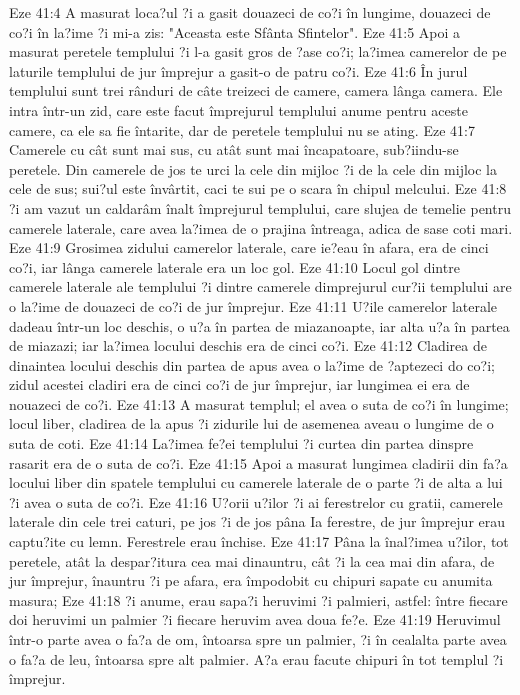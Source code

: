 Eze 41:4  A masurat loca?ul ?i a gasit douazeci de co?i în lungime, douazeci de co?i în la?ime ?i mi-a zis: "Aceasta este Sfânta Sfintelor".
Eze 41:5  Apoi a masurat peretele templului ?i l-a gasit gros de ?ase co?i; la?imea camerelor de pe laturile templului de jur împrejur a gasit-o de patru co?i.
Eze 41:6  În jurul templului sunt trei rânduri de câte treizeci de camere, camera lânga camera. Ele intra într-un zid, care este facut împrejurul templului anume pentru aceste camere, ca ele sa fie întarite, dar de peretele templului nu se ating.
Eze 41:7  Camerele cu cât sunt mai sus, cu atât sunt mai încapatoare, sub?iindu-se peretele. Din camerele de jos te urci la cele din mijloc ?i de la cele din mijloc la cele de sus; sui?ul este învârtit, caci te sui pe o scara în chipul melcului.
Eze 41:8  ?i am vazut un caldarâm înalt împrejurul templului, care slujea de temelie pentru camerele laterale, care avea la?imea de o prajina întreaga, adica de sase coti mari.
Eze 41:9  Grosimea zidului camerelor laterale, care ie?eau în afara, era de cinci co?i, iar lânga camerele laterale era un loc gol.
Eze 41:10  Locul gol dintre camerele laterale ale templului ?i dintre camerele dimprejurul cur?ii templului are o la?ime de douazeci de co?i de jur împrejur.
Eze 41:11  U?ile camerelor laterale dadeau într-un loc deschis, o u?a în partea de miazanoapte, iar alta u?a în partea de miazazi; iar la?imea locului deschis era de cinci co?i.
Eze 41:12  Cladirea de dinaintea locului deschis din partea de apus avea o la?ime de ?aptezeci do co?i; zidul acestei cladiri era de cinci co?i de jur împrejur, iar lungimea ei era de nouazeci de co?i.
Eze 41:13  A masurat templul; el avea o suta de co?i în lungime; locul liber, cladirea de la apus ?i zidurile lui de asemenea aveau o lungime de o suta de coti.
Eze 41:14  La?imea fe?ei templului ?i curtea din partea dinspre rasarit era de o suta de co?i.
Eze 41:15  Apoi a masurat lungimea cladirii din fa?a locului liber din spatele templului cu camerele laterale de o parte ?i de alta a lui ?i avea o suta de co?i.
Eze 41:16  U?orii u?ilor ?i ai ferestrelor cu gratii, camerele laterale din cele trei caturi, pe jos ?i de jos pâna Ia ferestre, de jur împrejur erau captu?ite cu lemn. Ferestrele erau închise.
Eze 41:17  Pâna la înal?imea u?ilor, tot peretele, atât la despar?itura cea mai dinauntru, cât ?i la cea mai din afara, de jur împrejur, înauntru ?i pe afara, era împodobit cu chipuri sapate cu anumita masura;
Eze 41:18  ?i anume, erau sapa?i heruvimi ?i palmieri, astfel: între fiecare doi heruvimi un palmier ?i fiecare heruvim avea doua fe?e.
Eze 41:19  Heruvimul într-o parte avea o fa?a de om, întoarsa spre un palmier, ?i în cealalta parte avea o fa?a de leu, întoarsa spre alt palmier. A?a erau facute chipuri în tot templul ?i împrejur.
